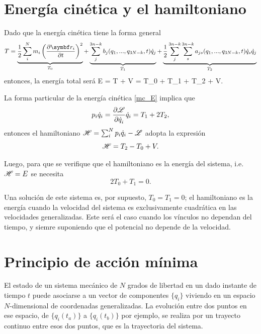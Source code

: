 \documentclass[10pt,oneside]{CBFT_book}
\begin{document}
\section{Energía cinética y el hamiltoniano}

Dado que la energía cinética tiene la forma general
\[
	T = \underbrace{\frac{1}{2} \sum_i^N m_i \left( \dpar{\vb{r}_i}{t} \right)^2}_{T_0}  +
	\underbrace{\sum_j^{3n-k} b_j(q_1,...,q_{3N-k},t)\dot{q}_j  }_{T_1} +
	\underbrace{\frac{1}{2} \sum_j^{3n-k}\sum_s^{3n-k}  a_{js}(q_1,...,q_{3N-k},t)\dot{q}_s\dot{q}_j }_{T_2}
\]
entonces, la energía total será 
\be
	E = T + V = T_0 + T_1 + T_2 + V.
	\label{mc_E}
\ee

La forma particular de la energía cinética \eqref{mc_E} implica que 
\[
	p_i \dot{q}_i = \frac{\partial^{\hspace{-0.05em}} {\mathscr{L}}}{\partial {\dot{q}_i}^{\hspace{-0.05em}}} \dot{q}_i = T_1 + 2 T_2, 
\]
entonces el hamiltoniano $\mathscr{H} = \sum_i^N p_i\dot{q}_i - \mathscr{L} $ adopta la expresión
\[
	\mathscr{H} = T_2 - T_0 + V.
\]

Luego, para que se verifique que el hamiltoniano es la energía del sistema, i.e. $\mathscr{H}=E$ se necesita
\[
	2T_0 + T_1 = 0.
\]

Una solución de este sistema es, por supuesto, $T_0 = T_1 = 0$; el hamiltoniano es la energía cuando la velocidad del sistema
es exclusivamente cuadrática en las velocidades generalizadas. Este será el caso cuando los vínculos no dependan del tiempo,
y siemre suponiendo que el potencial no depende de la velocidad.

\section{Principio de acción mínima}

El estado de un sistema mecánico de $ N $ grados de libertad en un dado instante de tiempo $ t $ puede asociarse a 
un vector de componentes $ \{ q_i \} $ viviendo en un espacio $N$-dimensional de coordenadas generalizadas. 
La evolución entre dos puntos en ese espacio, de $ \{ q_i(t_a) \} $  a $ \{ q_i(t_b) \} $ por ejemplo, se realiza por
un trayecto continuo entre esos dos puntos, que es la trayectoria del sistema.
\end{document}
